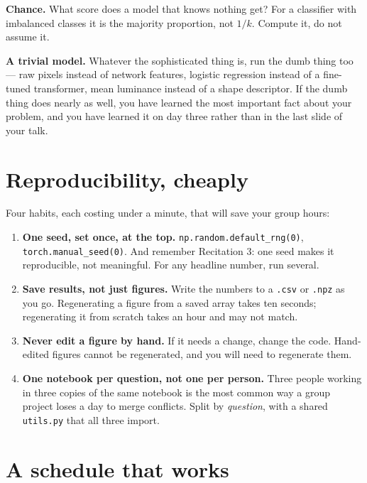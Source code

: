 \documentclass[11pt]{article}
\begin{document}
\textbf{Chance.} What score does a model that knows nothing get? For a classifier
with imbalanced classes it is the majority proportion, not $1/k$. Compute it, do
not assume it.

\textbf{A trivial model.} Whatever the sophisticated thing is, run the dumb thing
too --- raw pixels instead of network features, logistic regression instead of a
fine-tuned transformer, mean luminance instead of a shape descriptor. If the dumb
thing does nearly as well, you have learned the most important fact about your
problem, and you have learned it on day three rather than in the last slide of
your talk.

\section{Reproducibility, cheaply}

Four habits, each costing under a minute, that will save your group hours:

\begin{enumerate}
  \item \textbf{One seed, set once, at the top.} \texttt{np.random.default\_rng(0)},
        \texttt{torch.manual\_seed(0)}. And remember Recitation 3: one seed makes
        it reproducible, not meaningful. For any headline number, run several.
  \item \textbf{Save results, not just figures.} Write the numbers to a
        \texttt{.csv} or \texttt{.npz} as you go. Regenerating a figure from a
        saved array takes ten seconds; regenerating it from scratch takes an
        hour and may not match.
  \item \textbf{Never edit a figure by hand.} If it needs a change, change the
        code. Hand-edited figures cannot be regenerated, and you will need to
        regenerate them.
  \item \textbf{One notebook per question, not one per person.} Three people
        working in three copies of the same notebook is the most common way a
        group project loses a day to merge conflicts. Split by \emph{question},
        with a shared \texttt{utils.py} that all three import.
\end{enumerate}

\section{A schedule that works}
\end{document}
